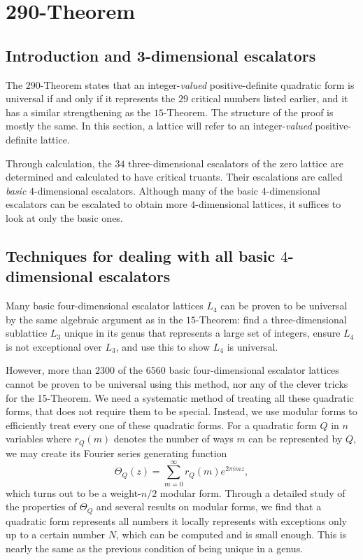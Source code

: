 \documentclass[letterpaper, 12pt]{article}
\begin{document}
\section{290-Theorem}
\subsection{Introduction and 3-dimensional escalators}
The $290$-Theorem \cite{twoninety} states that an integer-\emph{valued} positive-definite quadratic form is universal if and only if it represents the $29$ critical numbers listed earlier,
and it has a similar strengthening as the $15$-Theorem.
The structure of the proof is mostly the same.
In this section, a lattice will refer to an integer-\emph{valued} positive-definite lattice.

Through calculation, the $34$ three-dimensional escalators of the zero lattice are determined and calculated to have critical truants.
Their escalations are called \emph{basic} $4$-dimensional escalators. Although many of the basic $4$-dimensional escalators can be escalated to obtain more $4$-dimensional lattices, it suffices to look at only the basic ones.

\subsection{Techniques for dealing with all basic $4$-dimensional escalators}
Many basic four-dimensional escalator lattices $L_4$ can be proven to be universal by the same algebraic argument as in the $15$-Theorem:
find a three-dimensional sublattice $L_3$ unique in its genus that represents a large set of integers, ensure $L_4$ is not exceptional over $L_3$, and use this to show $L_4$ is universal.

However, more than $2300$ of the $6560$ basic four-dimensional escalator lattices cannot be proven to be universal using this method, nor any of the clever tricks for the 15-Theorem. We need a systematic method of treating all these quadratic forms, that does not require them to be special.
Instead, we use modular forms to efficiently treat every one of these quadratic forms. For a quadratic form $Q$ in $n$ variables where $r_Q(m)$ denotes the number of ways $m$ can be represented by $Q$, we may create its Fourier series generating function
\[\Theta_Q(z) = \sum_{m = 0}^{\infty} r_Q(m) e^{2\pi i m z},\]
which turns out to be a weight-$n/2$ modular form. Through a detailed study of the properties of $\Theta_Q$ and several results on modular forms, we find that a quadratic form represents all numbers it locally represents with exceptions only up to a certain number $N$, which can be computed and is small enough. This is nearly the same as the previous condition of being unique in a genus.
\end{document}
